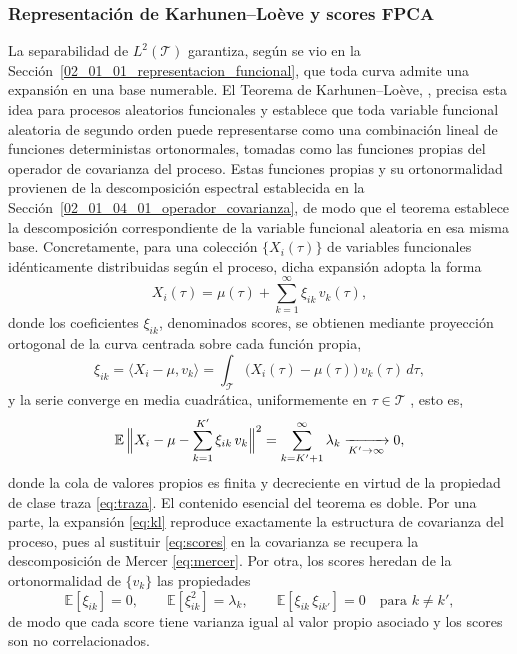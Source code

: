 \subsubsection{Representación de Karhunen–Loève y scores FPCA}
\label{02_01_04_02_karhunen_loeve_scores}
La separabilidad de $L^2(\mathcal{T})$ garantiza, según se vio en la Sección~\ref{02_01_01_representacion_funcional}, que toda curva admite una expansión en una base numerable. El Teorema de Karhunen--Loève, \cite{02_01_kokoszka2017introduction}, precisa esta idea para procesos aleatorios funcionales y establece que toda variable funcional aleatoria de segundo orden puede representarse como una combinación lineal de funciones deterministas ortonormales, tomadas como las funciones propias del operador de covarianza del proceso. Estas funciones propias y su ortonormalidad provienen de la descomposición espectral establecida en la Sección~\ref{02_01_04_01_operador_covarianza}, de modo que el teorema establece la descomposición correspondiente de la variable funcional aleatoria en esa misma base. Concretamente, para una colección $\{X_i(\tau)\}$ de variables funcionales idénticamente distribuidas según el proceso, dicha expansión adopta la forma
\begin{equation}\label{eq:kl}
    X_i(\tau) = \mu(\tau) + \sum_{k=1}^{\infty}
    \xi_{ik}\, v_k(\tau),
\end{equation}
donde los coeficientes $\xi_{ik}$, denominados scores, se obtienen mediante proyección ortogonal de la curva centrada sobre cada función propia,
\begin{equation}\label{eq:scores}
    \xi_{ik} = \langle X_i - \mu, v_k \rangle
    = \int_{\mathcal{T}}
    \bigl(X_i(\tau) - \mu(\tau)\bigr)\, v_k(\tau)\, d\tau,
\end{equation}
y la serie converge en media cuadrática, uniformemente en $\tau \in \mathcal{T}$ \cite{02_01_kokoszka2017introduction}, esto es,
\begin{equation}
    \mathbb{E}\,\Bigl\| X_i - \mu - \sum_{k=1}^{K'}\xi_{ik}\,v_k \Bigr\|^2
    = \sum_{k=K'+1}^{\infty}\lambda_k \xrightarrow[K' \to \infty]{} 0,
\end{equation}
donde la cola de valores propios es finita y decreciente en virtud de la propiedad de clase traza \eqref{eq:traza}. El contenido esencial del teorema es doble. Por una parte, la expansión \eqref{eq:kl} reproduce exactamente la estructura de covarianza del proceso, pues al sustituir \eqref{eq:scores} en la covarianza se recupera la descomposición de Mercer \eqref{eq:mercer}. Por otra, los scores heredan de la ortonormalidad de $\{v_k\}$ las propiedades \cite{02_01_kokoszka2017introduction}
\begin{equation}
    \mathbb{E}[\xi_{ik}] = 0,
    \qquad
    \mathbb{E}[\xi_{ik}^2] = \lambda_k,
    \qquad
    \mathbb{E}[\xi_{ik}\, \xi_{ik'}] = 0 \quad \text{para } k \neq k',
\end{equation}
de modo que cada score tiene varianza igual al valor propio asociado y los scores son no correlacionados.\\

